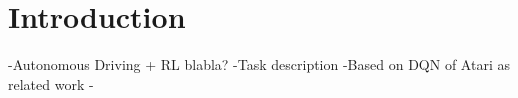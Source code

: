 
\section{Introduction}
-Autonomous Driving + RL blabla?
-Task description
	-Based on DQN\cite{Mnih13} of Atari as related work
-